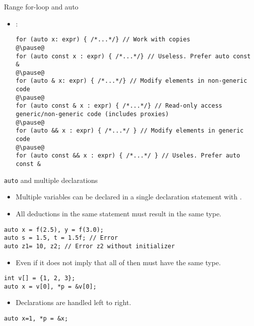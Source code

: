 \begin{frame}[t,fragile]{Range for-loop and auto}
\begin{itemize}
  \item {}:

\begin{lstlisting}[escapechar=@]
for (auto x: expr) { /*...*/} // Work with copies
@\pause@
for (auto const x : expr) { /*...*/} // Useless. Prefer auto const &
@\pause@
for (auto & x: expr) { /*...*/} // Modify elements in non-generic code
@\pause@
for (auto const & x : expr) { /*...*/} // Read-only access generic/non-generic code (includes proxies)
@\pause@
for (auto && x : expr) { /*...*/ } // Modify elements in generic code
@\pause@
for (auto const && x : expr) { /*...*/ } // Useles. Prefer auto const &
\end{lstlisting}

\end{itemize}
\end{frame}

\begin{frame}[fragile]{\texttt{auto} and multiple declarations}
\begin{itemize}
  \item Multiple variables can be declared in a single declaration statement with .
  \item All deductions in the same statement must result in the same type.
\end{itemize}
\begin{lstlisting}
auto x = f(2.5), y = f(3.0);
auto s = 1.5, t = 1.5f; // Error
auto z1= 10, z2; // Error z2 without initializer
\end{lstlisting}
\begin{itemize}

  \item Even if it does not imply that all of then must have the same type.
\end{itemize}
\begin{lstlisting}
int v[] = {1, 2, 3};
auto x = v[0], *p = &v[0];
\end{lstlisting}
\begin{itemize}
  \item Declarations are handled left to right.
\end{itemize}
\begin{lstlisting}
auto x=1, *p = &x;
\end{lstlisting}
\end{frame}

